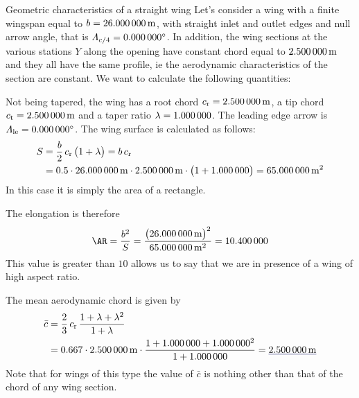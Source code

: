 \documentclass[[12pt,twoside]{book}
\begin{document}
%

%


\begin{myExampleX}{Geometric characteristics of a straight wing}{}%
\label{example:Wing:Basic:AA}
%
\noindent
Let's consider a wing with a finite wingspan equal to $b=\SI[round-precision=1]{\mySpanWingMT}{\metre}$,
with straight inlet and outlet edges and
null arrow angle, that is $\Lambda_{c/4}=\SI[round-precision=1]{\myLambdaCQuarter}{\degree}$.
In addition, the wing sections at the various stations $Y$ along the opening have constant chord
equal to $\SI[round-precision=2]{\myChordRootWingMT}{\metre}$
and they all have the same profile, ie the aerodynamic characteristics of the section are constant.
We want to calculate the following quantities:

\noindent
{}%

\medskip
\noindent
Not being tapered, the wing has a root chord
$c_\mathrm{r}=\SI[round-precision=2]{\myChordRootWingMT}{\metre}$,
a tip chord $c_\mathrm{t}=\SI[round-precision=2]{\myChordTipWingMT}{\metre}$
and a taper ratio $\lambda=\SI[round-precision=0]{\myTaperRatioWing}{}$.
The leading edge arrow is
 $\Lambda_\mathrm{le}=\SI[round-precision=0]{\myLambdaCQuarter}{\degree}$.
\noindent
The wing surface is calculated as follows:
\[
\begin{split}
S & {}= \frac{b}{2} \, c_\mathrm{r} \, \big( 1 + \lambda \big) = b\,c_\mathrm{r}\\
  & {}=
    \num{0.5} \cdot \SI[round-precision=1]{\mySpanWingMT}{\metre}
      \cdot \SI[round-precision=2]{\myChordRootWingMT}{\metre}
      \cdot \big( 1 + \SI[round-precision=0]{\myTaperRatioWing}{} \big) 
    = { \SI[round-precision=1]{\myAreaWingMTsquared}{\metre^2} }
\end{split}
\]
In this case it is simply the area of a rectangle.

\noindent
The elongation is therefore
\[
\AR 
  = \frac{b^2}{S}
  = \frac{\big(\SI[round-precision=1]{\mySpanWingMT}{\metre}\big)^2}{\SI[round-precision=1]{\myAreaWingMTsquared}{\metre^2}}
  ={ \num[round-precision=2]{\myAspectRatioWing} }
\]
This value is greater than $\num[round-precision=0]{10}$ allows us to say that we are in
presence of a wing of high aspect ratio.


\noindent
The mean aerodynamic chord is given by
 
\[
\begin{split}
\bar{c} & {}= \frac{2}{3} \, c_\mathrm{r} \, \frac{1+\lambda + \lambda^2}{1+\lambda} \\
  & {}=
    \num{0.667} \cdot \SI[round-precision=2]{\myChordRootWingMT}{\metre}
      \cdot 
        \frac{
          1 + \SI[round-precision=0]{\myTaperRatioWing}{} + \SI[round-precision=0]{\myTaperRatioWing}{}^2
        }{
          1 + \SI[round-precision=0]{\myTaperRatioWing}{}
        }
    = \mathunderline{mydarkblue}{ \SI[round-precision=2]{\myMACWingMT}{\metre} }
\end{split}
\]
Note that for wings of this type the value of $\bar{c} $ is nothing other than that of the chord
of any wing section.


\end{myExampleX}
\end{document}
